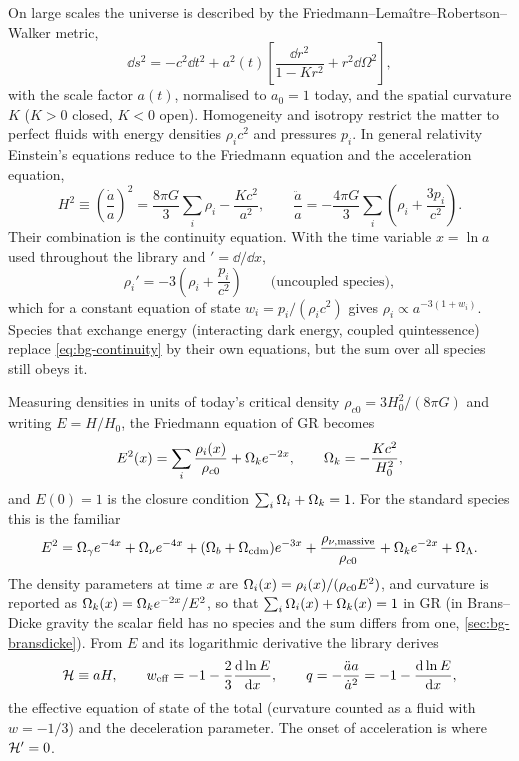 On large scales the universe is described by the Friedmann--Lema\^itre--Robertson--Walker metric,
\begin{equation}
\dd s^2=-c^2\dd t^2+a^2(t)\left[\frac{\dd r^2}{1-Kr^2}+r^2\dd\Omega^2\right],
\end{equation}
with the scale factor $a(t)$, normalised to $a_0=1$ today, and the spatial curvature $K$ ($K>0$ closed, $K<0$ open).
Homogeneity and isotropy restrict the matter to perfect fluids with energy densities $\rho_ic^2$ and pressures $p_i$.
In general relativity Einstein's equations reduce to the Friedmann equation and the acceleration equation,
\begin{equation}
H^2\equiv\left(\frac{\dot a}{a}\right)^2=\frac{8\pi G}{3}\sum_i\rho_i-\frac{Kc^2}{a^2},\qquad
\frac{\ddot a}{a}=-\frac{4\pi G}{3}\sum_i\left(\rho_i+\frac{3p_i}{c^2}\right).
\label{eq:bg-friedmann}
\end{equation}
Their combination is the continuity equation. With the time variable $x=\ln a$ used throughout the library and
$'=\dd/\dd x$,
\begin{equation}
\rho_i'=-3\left(\rho_i+\frac{p_i}{c^2}\right)\qquad\text{(uncoupled species)},
\label{eq:bg-continuity}
\end{equation}
which for a constant equation of state $w_i=p_i/(\rho_ic^2)$ gives $\rho_i\propto a^{-3(1+w_i)}$. Species that
exchange energy (interacting dark energy, coupled quintessence) replace \cref{eq:bg-continuity} by their own
equations, but the sum over all species still obeys it.

Measuring densities in units of today's critical density $\rho_{c0}=3H_0^2/(8\pi G)$ and writing $E=H/H_0$, the
Friedmann equation of GR becomes
\begin{equation}
E^2(x)=\sum_i\frac{\rho_i(x)}{\rho_{c0}}+\Omega_ke^{-2x},\qquad \Omega_k=-\frac{Kc^2}{H_0^2},
\label{eq:bg-E2}
\end{equation}
and $E(0)=1$ is the closure condition $\sum_i\Omega_i+\Omega_k=1$. For the standard species this is the familiar
\begin{equation}
E^2=\Omega_\gamma e^{-4x}+\Omega_\nu e^{-4x}+(\Omega_b+\Omega_{\rm cdm})e^{-3x}+\frac{\rho_{\nu,\rm massive}}{\rho_{c0}}
+\Omega_ke^{-2x}+\Omega_\Lambda .
\end{equation}
The density parameters at time $x$ are $\Omega_i(x)=\rho_i(x)/(\rho_{c0}E^2)$, and curvature is reported as
$\Omega_k(x)=\Omega_ke^{-2x}/E^2$, so that $\sum_i\Omega_i(x)+\Omega_k(x)=1$ in GR (in Brans--Dicke gravity the scalar field
has no species and the sum differs from one, \cref{sec:bg-bransdicke}). From $E$ and its logarithmic derivative the
library derives
\begin{equation}
\mathcal{H}\equiv aH,\qquad w_{\rm eff}=-1-\frac23\frac{\mathrm{d}\ln E}{\mathrm{d} x},\qquad q=-\frac{\ddot aa}{\dot a^2}=-1-\frac{\mathrm{d}\ln E}{\mathrm{d} x},
\end{equation}
the effective equation of state of the total (curvature counted as a fluid with $w=-1/3$) and the deceleration
parameter. The onset of acceleration is where $\mathcal{H}'=0$.

